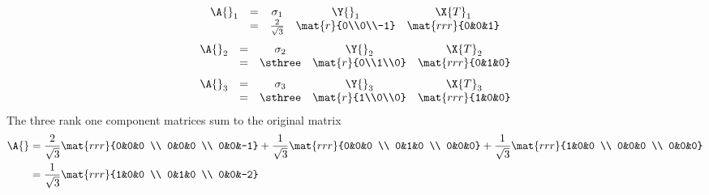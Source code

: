 \begin{equation}
  \begin{array}{ccccccccccccc}
    \A{}_{1} &=& \sigma_{1} & \Y{}_{1} & \X{T}_{1} \\
    &=& \frac{2}{\sqrt{3}} & \mat{r}{0\\0\\-1}&\mat{rrr}{0&0&1}
  \end{array}
\end{equation}
\begin{equation}
  \begin{array}{ccccccccccccc}
    \A{}_{2} &=& \sigma_{2} & \Y{}_{2} & \X{T}_{2} \\
    &=& \sthree& \mat{r}{0\\1\\0}&\mat{rrr}{0&1&0}
  \end{array}
\end{equation}
\begin{equation}
  \begin{array}{ccccccccccccc}
    \A{}_{3} &=& \sigma_{3} & \Y{}_{3} & \X{T}_{3} \\
    &=& \sthree & \mat{r}{1\\0\\0}&\mat{rrr}{1&0&0}
  \end{array}
\end{equation}
The three rank one component matrices sum to the original matrix
\begin{equation}
  \begin{split}
    \A{} &= \frac{2}{\sqrt{3}}  \mat{rrr}{0&0&0 \\ 0&0&0 \\ 0&0&-1} + \frac{1}{\sqrt{3}}  \mat{rrr}{0&0&0 \\ 0&1&0 \\ 0&0&0} + \frac{1}{\sqrt{3}}  \mat{rrr}{1&0&0 \\ 0&0&0 \\ 0&0&0}\\
    &=\frac{1}{\sqrt{3}} \mat{rrr}{1&0&0 \\ 0&1&0 \\ 0&0&-2}
  \end{split}
\end{equation}
